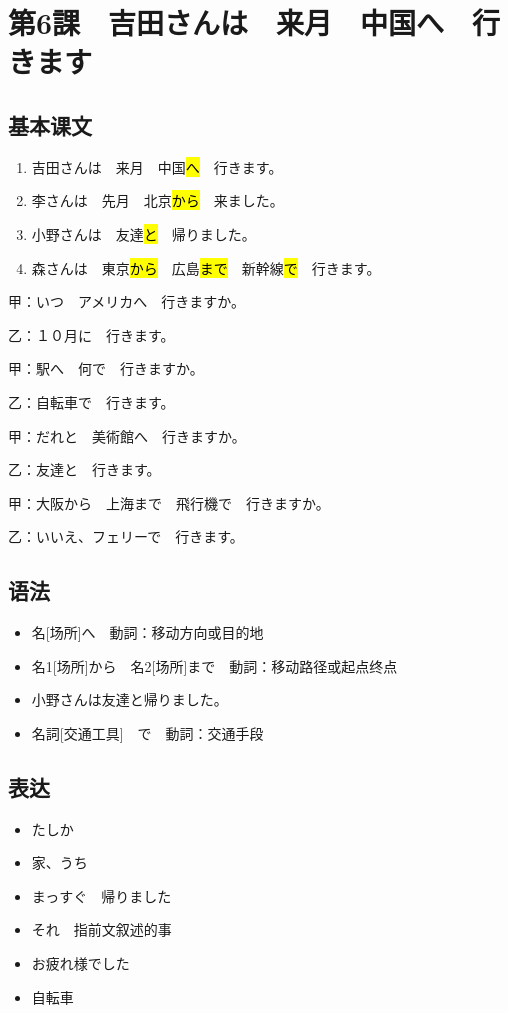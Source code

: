 \section{第6課　吉田さんは　来月　中国へ　行きます}

\subsection{基本课文}

\begin{enumerate}
    \item 吉田さんは　来月　中国\hl{へ}　行きます。
    \item 李さんは　先月　北京\hl{から}　来ました。
    \item 小野さんは　友達\hl{と}　帰りました。
    \item 森さんは　東京\hl{から}　広島\hl{まで}　新幹線\hl{で}　行きます。
\end{enumerate}

甲：いつ　アメリカへ　行きますか。

乙：１０月に　行きます。

甲：駅へ　何で　行きますか。

乙：自転車で　行きます。

甲：だれと　美術館へ　行きますか。

乙：友達と　行きます。

甲：大阪から　上海まで　飛行機で　行きますか。

乙：いいえ、フェリーで　行きます。


\subsection{语法}

\begin{itemize}
    \item 名[场所]へ　動詞：移动方向或目的地
    \item 名1[场所]から　名2[场所]まで　動詞：移动路径或起点终点
    \item 小野さんは友達と帰りました。
    \item 名詞[交通工具]　で　動詞：交通手段
\end{itemize}

\subsection{表达}

\begin{itemize}
    \item たしか
    \item 家、うち
    \item まっすぐ　帰りました
    \item それ　指前文叙述的事
    \item お疲れ様でした
    \item 自転車
\end{itemize}

